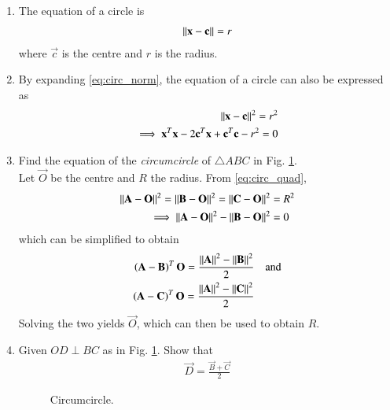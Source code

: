 \renewcommand{\theequation}{\theenumi}
\begin{enumerate}[label=\arabic*.,ref=\thesubsection.\theenumi]
\item The equation of a circle is 
\begin{align}
\label{eq:circ_norm}
\left\lVert\mathbf{x}-\mathbf{c}\right\rVert = r
\end{align}
%
where $\vec{c}$ is the centre and $r$ is the radius.
\item By expanding \eqref{eq:circ_norm}, the equation of a circle can also be expressed as
%
\begin{align}
\left\lVert\mathbf{x}-\mathbf{c}\right\rVert^2 = r^2&
\\
\implies \mathbf{x}^T\mathbf{x}-2\mathbf{c}^T\mathbf{x} + \mathbf{c}^T\mathbf{c}-r^2 = 0
\label{eq:circ_quad}
\end{align}
\item Find the equation of the {\em circumcircle} of  $\triangle ABC$ in Fig. \ref{fig:ccircle}.
\\
\solution Let $\vec{O}$ be the centre and $R$ the radius. From \eqref{eq:circ_quad},
\begin{align}
\left\lVert\mathbf{A}-\mathbf{O}\right\rVert^2 = \left\lVert\mathbf{B}-\mathbf{O}\right\rVert^2 = \left\lVert\mathbf{C}-\mathbf{O}\right\rVert^2 &= R^2
\\
\implies \left\lVert\mathbf{A}-\mathbf{O}\right\rVert^2 - \left\lVert\mathbf{B}-\mathbf{O}\right\rVert^2 &=0
\end{align}
which can be simplified to obtain
\begin{align}
\label{eq:defs_ccircle_c1}
\left(\mathbf{A}-\mathbf{B}\right)^T\mathbf{O}=\frac{\left\lVert\mathbf{A}\right\rVert^2 - \left\lVert\mathbf{B}\right\rVert^2}{2}& \quad \text{and}
\\
\left(\mathbf{A}-\mathbf{C}\right)^T\mathbf{O}=\frac{\left\lVert\mathbf{A}\right\rVert^2 - \left\lVert\mathbf{C}\right\rVert^2}{2}& 
\label{eq:defs_ccircle_c2}
\end{align}
%
Solving the two yields $\vec{O}$, which can then be used to obtain $R$.
\item Given
$OD \perp BC$ as in Fig. \ref{fig:ccircle}.  Show that 
\begin{align}
\vec{D}=\frac{\vec{B}+\vec{C}}{2}
\end{align}
%
\begin{figure}[!ht]
	\begin{center}
		
		\resizebox{\columnwidth}{!}{}
	\end{center}
	\caption{Circumcircle.}
	\label{fig:ccircle}	
\end{figure}



\end{enumerate}
